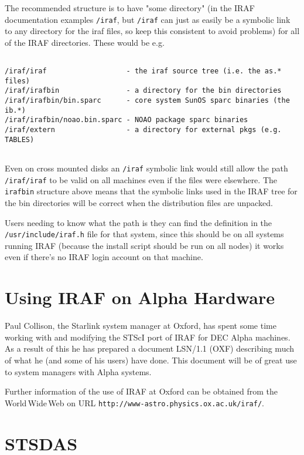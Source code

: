 The recommended structure is to have "some directory" (in the IRAF documentation
examples {\tt /iraf}, but {\tt /iraf} can just as easily be a symbolic link to 
any directory for the iraf files, so keep this consistent to avoid problems) 
for all of the IRAF directories.  These would be e.g.
 
{\footnotesize
\begin{verbatim}
 
/iraf/iraf                   - the iraf source tree (i.e. the as.* files)
/iraf/irafbin                - a directory for the bin directories
/iraf/irafbin/bin.sparc      - core system SunOS sparc binaries (the ib.*)
/iraf/irafbin/noao.bin.sparc - NOAO package sparc binaries
/iraf/extern                 - a directory for external pkgs (e.g. TABLES)
 
\end{verbatim}
}
 
Even on cross mounted disks an {\tt /iraf} symbolic link would still allow the
path {\tt /iraf/iraf} to be valid on all machines even if the files were elsewhere.  
The {\tt irafbin} structure above means that the symbolic links used in the
IRAF tree for the bin directories will be correct when the distribution
files are unpacked.
 
Users needing to know what the path is they can find the 
definition in the {\tt /usr/include/iraf.h} file for that system, since
this should be on all systems running IRAF (because the install script 
should be run on all nodes) it works even if there's no IRAF login account
on that machine.  
 
 
\section{Using IRAF on Alpha Hardware}

Paul Collison, the Starlink system manager at Oxford, has spent some
time working with and modifying the STScI port of IRAF for DEC Alpha 
machines. As a result of this he has prepared a document LSN/1.1 (OXF)
describing much of what he (and some of his users) have done. This 
document will be of great use to system managers with Alpha systems.

Further information of the use of IRAF at Oxford can be obtained from the
World\,Wide\,Web on URL
{\tt http://www-astro.physics.ox.ac.uk/iraf/}.

\section{STSDAS}

